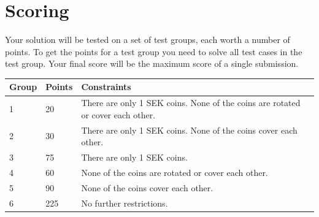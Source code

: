 \section*{Scoring}
Your solution will be tested on a set of test groups, each worth a number of points.
To get the points for a test group you need to solve all test cases in the test group.
Your final score will be the maximum score of a single submission.

\noindent
\begin{tabular}{| l | l | l |}
\hline
Group & Points & Constraints \\ \hline
1     & 20     & There are only 1 SEK coins. None of the coins are rotated or cover each other. \\ \hline
2     & 30     & There are only 1 SEK coins. None of the coins cover each other. \\ \hline
3     & 75     & There are only 1 SEK coins. \\ \hline
4     & 60     & None of the coins are rotated or cover each other. \\ \hline
5     & 90     & None of the coins cover each other. \\ \hline
6     & 225     & No further restrictions. \\ \hline
\end{tabular}
